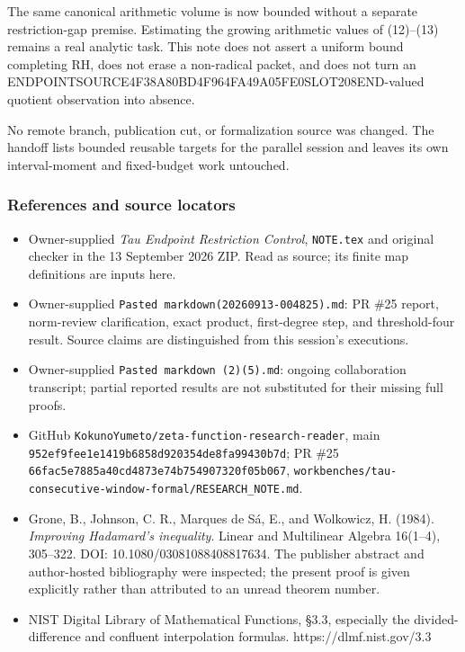 The same canonical arithmetic volume is now bounded without a separate restriction-gap premise. Estimating the growing arithmetic values of (12)--(13) remains a real analytic task. This note does not assert a uniform bound completing RH, does not erase a non-radical packet, and does not turn an ENDPOINTSOURCE4F38A80BD4F964FA49A05FE0SLOT208END-valued quotient observation into absence.

No remote branch, publication cut, or formalization source was changed. The handoff lists bounded reusable targets for the parallel session and leaves its own interval-moment and fixed-budget work untouched.

\subsubsection{References and source locators}\label{endpoint-relation_moment_original--references-and-source-locators}

\begin{itemize}
\tightlist
\item
  Owner-supplied \emph{Tau Endpoint Restriction Control}, \texttt{NOTE.tex} and original checker in the 13 September 2026 ZIP. Read as source; its finite map definitions are inputs here.
\item
  Owner-supplied \texttt{Pasted\ markdown(20260913-004825).md}: PR \#25 report, norm-review clarification, exact product, first-degree step, and threshold-four result. Source claims are distinguished from this session's executions.
\item
  Owner-supplied \texttt{Pasted\ markdown\ (2)(5).md}: ongoing collaboration transcript; partial reported results are not substituted for their missing full proofs.
\item
  GitHub \texttt{KokunoYumeto/zeta-function-research-reader}, main \texttt{952ef9fee1e1419b6858d920354de8fa99430b7d}; PR \#25 \texttt{66fac5e7885a40cd4873e74b754907320f05b067}, \texttt{workbenches/tau-consecutive-window-formal/RESEARCH\_NOTE.md}.
\item
  Grone, B., Johnson, C. R., Marques de Sá, E., and Wolkowicz, H. (1984). \emph{Improving Hadamard's inequality}. Linear and Multilinear Algebra 16(1--4), 305--322. DOI: 10.1080/03081088408817634. The publisher abstract and author-hosted bibliography were inspected; the present proof is given explicitly rather than attributed to an unread theorem number.
\item
  NIST Digital Library of Mathematical Functions, §3.3, especially the divided-difference and confluent interpolation formulas. https://dlmf.nist.gov/3.3
\end{itemize}
